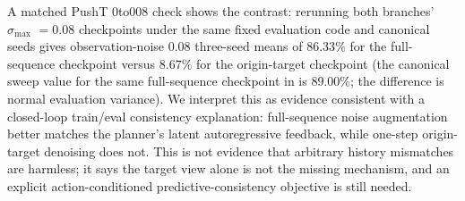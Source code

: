\documentclass[10pt]{article}
\newcommand{\stdmax}{\ensuremath{\sigma_{\max}}}
\begin{document}
A matched PushT 0to008 check shows the contrast: rerunning both branches' \stdmax{} $= 0.08$ checkpoints under the same fixed evaluation code and canonical seeds gives observation-noise 0.08 three-seed means of $86.33\%$ for the full-sequence checkpoint versus $8.67\%$ for the origin-target checkpoint (the canonical sweep value for the same full-sequence checkpoint in  is $89.00\%$; the difference is normal evaluation variance). We interpret this as evidence consistent with a closed-loop train/eval consistency explanation: full-sequence noise augmentation better matches the planner's latent autoregressive feedback, while one-step origin-target denoising does not. This is not evidence that arbitrary history mismatches are harmless; it says the target view alone is not the missing mechanism, and an explicit action-conditioned predictive-consistency objective is still needed.
\end{document}
